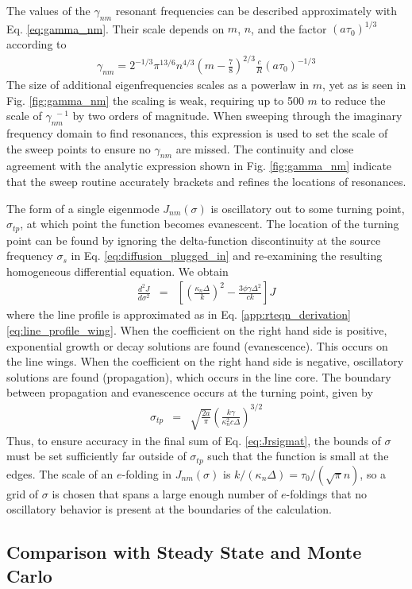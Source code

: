 \documentclass{aastex63}
\newcommand{\be}{\begin{eqnarray}}
\newcommand{\ee}{\end{eqnarray}}
\begin{document}
The values of the $\gamma_{nm}$ resonant frequencies can be described approximately with Eq. \ref{eq:gamma_nm}. Their scale depends on $m$, $n$, and the factor $(a\tau_0)^{1/3}$ according to 
\be \label{eq:gamma_nm}
\gamma_{nm} = 2^{-1/3} \pi^{13/6} n^{4/3}\left(m-\frac{7}{8}\right)^{2/3}\frac{c}{R}(a\tau_0)^{-1/3} 
\ee
The size of additional eigenfrequencies scales as a powerlaw in $m$, yet as is seen in Fig. \ref{fig:gamma_nm} the scaling is weak, requiring up to 500 $m$ to reduce the scale of $\gamma_{nm}^{\ \ -1}$ by two orders of magnitude. When sweeping through the imaginary frequency domain to find resonances, this expression is used to set the scale of the sweep points to ensure no $\gamma_{nm}$ are missed. The continuity and close agreement with the analytic expression shown in Fig. \ref{fig:gamma_nm} indicate that the sweep routine accurately brackets and refines the locations of resonances.

The form of a single eigenmode $J_{nm}(\sigma)$ is oscillatory out to some turning point, $\sigma_{tp}$, at which point the function becomes evanescent. The location of the turning point can be found by ignoring the delta-function discontinuity at the source frequency $\sigma_s$ in Eq. \ref{eq:diffusion_plugged_in} and re-examining the resulting homogeneous differential equation. We obtain
\be
\frac{d^2J}{d\sigma^2} & = & \left[ \left( \frac{\kappa_n \Delta }{k} \right)^2 - \frac{3\phi \gamma\Delta^2}{ck}\right] J
\ee
where the line profile is approximated as in Eq. \ref{app:rteqn_derivation}\ref{eq:line_profile_wing}. When the coefficient on the right hand side is positive, exponential growth or decay solutions are found (evanescence). This occurs on the line wings. When the coefficient on the right hand side is negative, oscillatory solutions are found (propagation), which occurs in the line core. The boundary between propagation and evanescence occurs at the turning point, given by
\be
\sigma_{tp} & = & \sqrt{\frac{2a}{\pi}}\left( \frac{k \gamma}{ \kappa_n^2 c \Delta} \right)^{3/2}
\ee
Thus, to ensure accuracy in the final sum of Eq. \ref{eq:Jrsigmat}, the bounds of $\sigma$ must be set sufficiently far outside of $\sigma_{tp}$ such that the function is small at the edges. The scale of an $e$-folding in $J_{nm}(\sigma)$ is $k/(\kappa_n \Delta) = \tau_0 / (\sqrt{\pi} n)$, so a grid of $\sigma$ is chosen that spans a large enough number of $e$-foldings that no oscillatory behavior is present at the boundaries of the calculation.

\subsection{Comparison with Steady State and Monte Carlo}
\end{document}
